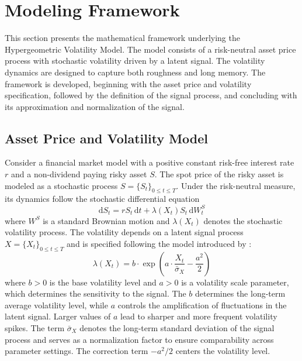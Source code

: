 \section{Modeling Framework} \label{sec: Modeling Framework}

This section presents the mathematical framework underlying the Hypergeometric Volatility Model. The model consists of a risk-neutral asset price process with stochastic volatility driven by a latent signal. The volatility dynamics are designed to capture both roughness and long memory. The framework is developed, beginning with the asset price and volatility specification, followed by the definition of the signal process, and concluding with its approximation and normalization of the signal.


\subsection{Asset Price and Volatility Model} \label{subsec: Asset Price Volatility Model}

Consider a financial market model with a positive constant risk-free interest rate $r$ and a non-dividend paying risky asset $S$. The spot price of the risky asset is modeled as a stochastic process $S = \{S_t\}_{0 \leq t \leq T}$. Under the risk-neutral measure, its dynamics follow the stochastic differential equation
\begin{equation} \label{eq:AssetSDE}
    \mathrm{d} S_t = r S_t \,\mathrm{d}t + \lambda(X_t) S_t \,\mathrm{d}W_t^S
\end{equation}
where $W^S$ is a standard Brownian motion and $\lambda(X_t)$ denotes the stochastic volatility process. The volatility depends on a latent signal process $X = \{X_t\}_{0 \leq t \leq T}$ and is specified following the model introduced by \citet{BennedsenLundePakkanen2021}:
\begin{equation} \label{eq:Volatility}
    \lambda(X_t) = b \cdot \exp \left( a \cdot \frac{X_t}{\bar{\sigma}_X} - \frac{a^2}{2} \right)
\end{equation}
where $b > 0$ is the base volatility level and $a > 0$ is a volatility scale parameter, which determines the sensitivity to the signal. The $b$ determines the long-term average volatility level, while $a$ controls the amplification of fluctuations in the latent signal. Larger values of $a$ lead to sharper and more frequent volatility spikes. The term $\bar{\sigma}_X$ denotes the long-term standard deviation of the signal process and serves as a normalization factor to ensure comparability across parameter settings. The correction term $-a^2/2$ centers the volatility level. 

